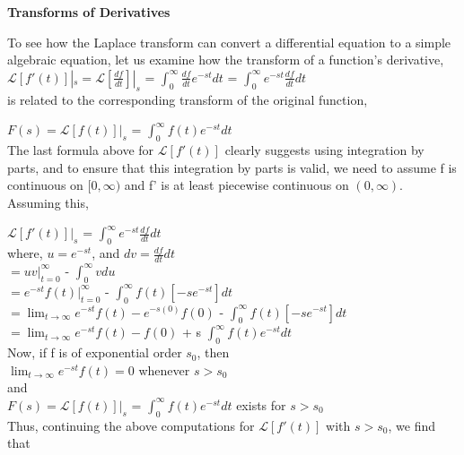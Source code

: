 \documentclass[12pt]{article}
\begin{document}
{\textbf{Transforms of Derivatives}

To see how the Laplace transform can convert a differential equation to a simple algebraic equation, let us examine how the transform of a function’s derivative,\\

$\mathcal{L} [f'(t)]|_{s} = \mathcal{L} [\frac{df}{dt}]|_{s}$ = \(\int_{0}^{\infty} \frac{df}{dt} e^{-st}dt\) = \(\int_{0}^{\infty} e^{-st} \frac{df}{dt} dt\)\\

is related to the corresponding transform of the original function,

$F(s) = \mathcal{L} [f(t)]|_{s}$ = \(\int_{0}^{\infty} f(t)e^{-st} dt\)\\

The last formula above for $\mathcal{L} [f'(t)]$ clearly suggests using integration by parts, and to ensure
that this integration by parts is valid, we need to assume f is continuous on $[0,\infty)$ and f' is
at least piecewise continuous on $(0,\infty)$. Assuming this,

$\mathcal{L} [f'(t)]|_{s}$ = \(\int_{0}^{\infty} e^{-st} \frac{df}{dt} dt\)\\

where, $u = e^{-st}$, and $dv = \frac{df}{dt} dt$\\

$= uv|_{t = 0}^{\infty}$ - \(\int_{0}^{\infty} vdu\)\\

$= e^{-st} f(t)|_{t=0}^{\infty}$ - \(\int_{0}^{\infty} f(t)[-se^{-st}]dt\)\\

$= \lim_{t \to \infty} e^{-st} f(t) - e^{-s(0)}f(0)$ - \(\int_{0}^{\infty} f(t)[-se^{-st}]dt\)\\

$= \lim_{t \to \infty} e^{-st} f(t) - f(0)$ + s \(\int_{0}^{\infty} f(t)e^{-st}dt\)\\

Now, if f is of exponential order $s_0$, then\\

$\lim_{t \to \infty} e^{-st} f(t) = 0$		whenever $s>s_0$\\

and\\

$F(s) = \mathcal{L}[f(t)]|_s$ = \(\int_{0}^{\infty} f(t)e^{-st}dt\)		exists for $s>s_0$\\

Thus, continuing the above computations for $\mathcal{L}[f'(t)]$ with $s>s_0$, we find that \\

}
\end{document}
